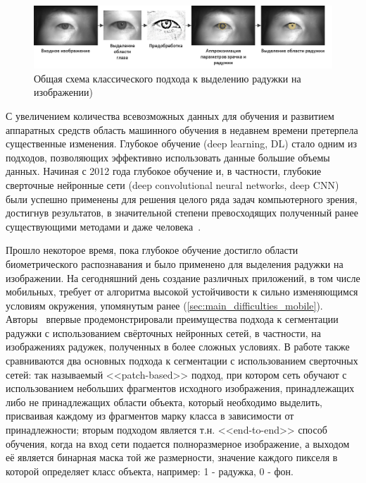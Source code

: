 \begin{figure}[h!]
	\centering
	\includegraphics[width=0.95\columnwidth]{pictures/segm-classic-approach.png}
	\caption{Общая схема классического подхода к выделению радужки на изображении)}
	\label{fig:segm-classic-approach}
\end{figure}

С увеличением количества всевозможных данных для обучения и развитием аппаратных средств область машинного обучения в недавнем времени претерпела существенные изменения. Глубокое обучение (deep learning, DL) стало одним из подходов, позволяющих эффективно использовать данные большие объемы данных. Начиная с 2012 года глубокое обучение и, в частности, глубокие сверточные нейронные сети (deep convolutional neural networks, deep CNN) были успешно применены для решения целого ряда задач компьютерного зрения, достигнув результатов, в значительной степени превосходящих полученный ранее существующими методами и даже человека~\cite{krizhevsky_2012,girshick_2014,toshev_2014,karpathy_2014}.

Прошло некоторое время, пока глубокое обучение достигло области биометрического распознавания и было применено для выделения радужки на изображении. На сегодняшний день создание различных приложений, в том числе мобильных, требует от алгоритма высокой устойчивости к сильно изменяющимся условиям окружения, упомянутым ранее (\ref{sec:main_difficulties_mobile}). Авторы~\cite{liu_2016} впервые продемонстрировали преимущества подхода к сегментации радужки с использованием свёрточных нейронных сетей, в частности, на изображениях радужек, полученных в более сложных условиях. В работе также сравниваются два основных подхода к сегментации с использованием сверточных сетей: так называемый <<patch-based>> подход, при котором сеть обучают с использованием небольших фрагментов исходного изображения, принадлежащих либо не принадлежащих области объекта, который необходимо выделить, присваивая каждому из фрагментов марку класса в зависимости от принадлежности; вторым подходом является т.н. <<end-to-end>> способ обучения, когда на вход сети подается полноразмерное изображение, а выходом её является бинарная маска той же размерности, значение каждого пикселя в которой определяет класс объекта, например: 1 - радужка, 0 - фон.


